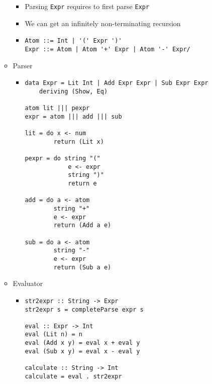 \begin{itemize}
\begin{itemize}
\begin{itemize}
                    \item Parsing \verb+Expr+ requires to first parse \verb+Expr+
                    \item We can get an infinitely non-terminating recursion
                    \item
\begin{verbatim}
Atom ::= Int | '(' Expr ')'
Expr ::= Atom | Atom '+' Expr | Atom '-' Expr/
\end{verbatim}
                \end{itemize}
            \item Parser
                \begin{itemize}
                    \item
\begin{verbatim}
data Expr = Lit Int | Add Expr Expr | Sub Expr Expr
    deriving (Show, Eq)

atom lit ||| pexpr
expr = atom ||| add ||| sub

lit = do x <- num
        return (Lit x)

pexpr = do string "("
            e <- expr
            string ")"
            return e

add = do a <- atom
        string "+"
        e <- expr
        return (Add a e)

sub = do a <- atom
        string "-"
        e <- expr
        return (Sub a e)
\end{verbatim}
                \end{itemize}
            \item Evaluator
                \begin{itemize}
                    \item
\begin{verbatim}
str2expr :: String -> Expr
str2expr s = completeParse expr s

eval :: Expr -> Int
eval (Lit n) = n
eval (Add x y) = eval x + eval y
eval (Sub x y) = eval x - eval y

calculate :: String -> Int
calculate = eval . str2expr
\end{verbatim}
                \end{itemize}
        \end{itemize}
\end{itemize}

